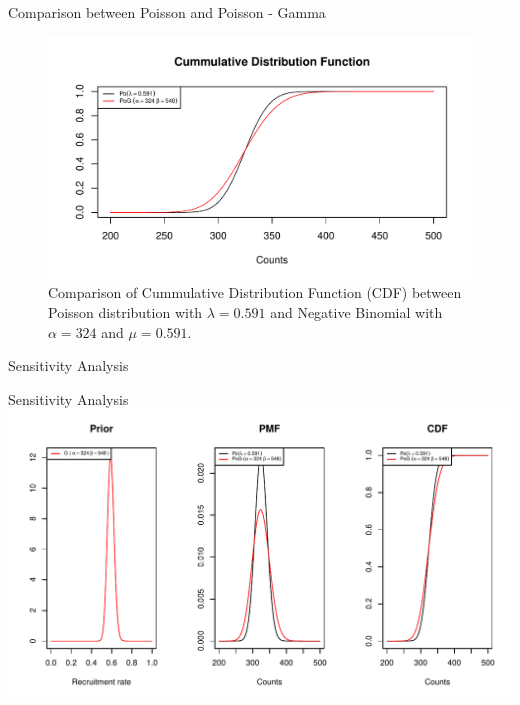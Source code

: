 \documentclass[english]{beamer}\usepackage[]{graphicx}\usepackage[]{xcolor}
\makeatletter
\def\maxwidth{ %
  \ifdim\Gin@nat@width>\linewidth
    \linewidth
  \else
    \Gin@nat@width
  \fi
}
\newenvironment{knitrout}{}{} %
\makeatother
\begin{document}
\begin{frame}{Comparison between Poisson and Poisson - Gamma}

\begin{figure}
\begin{knitrout}
\color{fgcolor}
\includegraphics[width=\maxwidth]{figures/figunnamed-chunk-10-1} 
\end{knitrout}
  \caption{Comparison of Cummulative Distribution Function (CDF) between Poisson distribution with $\lambda = 0.591$ and Negative Binomial with $\alpha = 324$ and $\mu = 0.591$.}
  \label{fig:2_7}
\end{figure}

\end{frame}

\begin{frame}{Sensitivity Analysis}


\end{frame}


\begin{frame}{Sensitivity Analysis}
\begin{knitrout}
\color{fgcolor}
\includegraphics[width=\maxwidth]{figures/figunnamed-chunk-11-1} 
\end{knitrout}

\end{frame}
\end{document}
